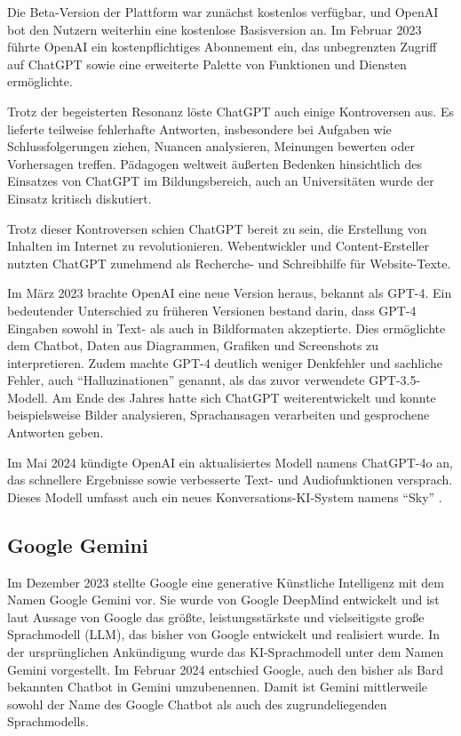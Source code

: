 Die Beta-Version der Plattform war zunächst kostenlos verfügbar, und OpenAI bot den Nutzern weiterhin eine kostenlose 
Basisversion an. Im Februar 2023 führte OpenAI ein kostenpflichtiges Abonnement ein, das unbegrenzten Zugriff auf ChatGPT 
sowie eine erweiterte Palette von Funktionen und Diensten ermöglichte.

Trotz der begeisterten Resonanz löste ChatGPT auch einige Kontroversen aus. Es lieferte teilweise fehlerhafte Antworten, 
insbesondere bei Aufgaben wie Schlussfolgerungen ziehen, Nuancen analysieren, Meinungen bewerten oder Vorhersagen treffen. 
Pädagogen weltweit äußerten Bedenken hinsichtlich des Einsatzes von ChatGPT im Bildungsbereich, auch an Universitäten wurde 
der Einsatz kritisch diskutiert.

Trotz dieser Kontroversen schien ChatGPT bereit zu sein, die Erstellung von Inhalten im Internet zu revolutionieren. 
Webentwickler und Content-Ersteller nutzten ChatGPT zunehmend als Recherche- und Schreibhilfe für Website-Texte.

Im März 2023 brachte OpenAI eine neue Version heraus, bekannt als GPT-4. Ein bedeutender Unterschied zu früheren Versionen 
bestand darin, dass GPT-4 Eingaben sowohl in Text- als auch in Bildformaten akzeptierte. Dies ermöglichte dem Chatbot, Daten 
aus Diagrammen, Grafiken und Screenshots zu interpretieren. Zudem machte GPT-4 deutlich weniger Denkfehler und sachliche Fehler, 
auch ``Halluzinationen'' genannt, als das zuvor verwendete GPT-3.5-Modell. Am Ende des Jahres hatte sich ChatGPT weiterentwickelt 
und konnte beispielsweise Bilder analysieren, Sprachansagen verarbeiten und gesprochene Antworten geben.

Im Mai 2024 kündigte OpenAI ein aktualisiertes Modell namens ChatGPT-4o an, das schnellere Ergebnisse sowie verbesserte 
Text- und Audiofunktionen versprach. Dieses Modell umfasst auch ein neues Konversations-KI-System namens ``Sky'' \cite{GrundlagenChatGPT}.

\subsection{Google Gemini}  \label{Google Gemini}

Im Dezember 2023 stellte Google eine generative Künstliche Intelligenz mit dem Namen Google Gemini vor. Sie wurde von Google DeepMind 
entwickelt und ist laut Aussage von Google das größte, leistungsstärkste und vielseitigste große Sprachmodell (LLM), das bisher von 
Google entwickelt und realisiert wurde. In der ursprünglichen Ankündigung wurde das KI-Sprachmodell unter dem Namen Gemini vorgestellt. 
Im Februar 2024 entschied Google, auch den bisher als Bard bekannten Chatbot in Gemini umzubenennen. Damit ist Gemini mittlerweile sowohl
der Name des Google Chatbot als auch des zugrundeliegenden Sprachmodells.

